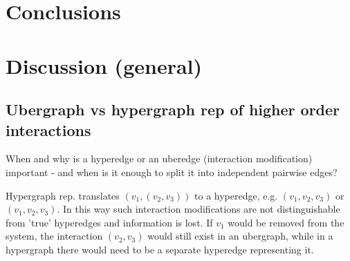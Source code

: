 \documentclass[a4paper,12pt]{article}
\theoremstyle{definition}
\theoremstyle{remark}
\begin{document}
\section{Conclusions}\label{sec:final}

 
	

\section{Discussion (general)}
\subsection{Ubergraph vs hypergraph rep of higher order interactions}

When and why is a hyperedge or an uberedge (interaction modification) important - and when is it enough to split it into independent pairwise edges?


Hypergraph rep. translates $(v_1, (v_2,v_3))$ to a hyperedge, e.g. $(v_1, {v_2,v_3})$ or $({v_1,v_2}, v_3)$.
In this way such interaction modifications are not distinguishable from 'true' hyperedges and information is lost. If $v_1$ would be removed from the system, the interaction $(v_2,v_3)$ would still exist in an ubergraph, while in a hypergraph there would need to be a separate hyperedge representing it.
\end{document}
